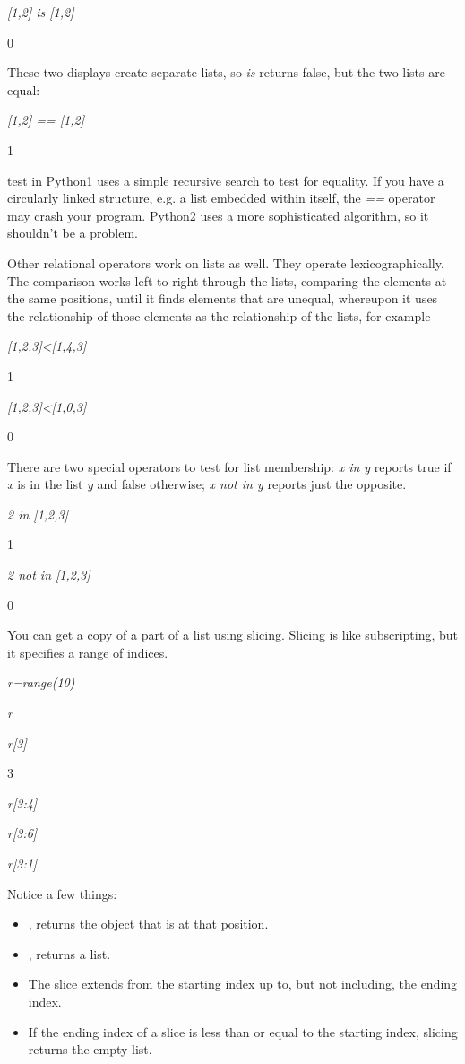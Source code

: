 \emph{{[}1,2{]} is {[}1,2{]}}

0

These two displays create separate
lists, so \emph{is} returns false, but the two lists are equal:


\emph{{[}1,2{]} == {[}1,2{]}}

1

 test in
Python1 uses a simple recursive search to test for equality. If you have
a circularly linked structure, e.g. a list embedded within itself, the
\emph{==} operator may crash your program. Python2 uses a more
sophisticated algorithm, so it shouldn't be a problem.

Other relational operators work on
lists as well. They operate lexicographically. The comparison works left
to right through the lists, comparing the elements at the same
positions, until it finds elements that are unequal, whereupon it uses
the relationship of those elements as the relationship of the lists, for
example


\emph{{[}1,2,3{]}\textless{}{[}1,4,3{]}}

1


\emph{{[}1,2,3{]}\textless{}{[}1,0,3{]}}

0

There are two special operators to
test for list membership: \emph{x in y} reports true if \emph{x} is in
the list \emph{y} and false otherwise; \emph{x not in y} reports just
the opposite.


\emph{2 in {[}1,2,3{]}}

1


\emph{2 not in {[}1,2,3{]}}

0

You can get a copy of a part of a
list using slicing. Slicing is like subscripting, but it specifies a
range of indices.


\emph{r=range(10)}


\emph{r}




\emph{r{[}3{]}}

3


\emph{r{[}3:4{]}}




\emph{r{[}3:6{]}}




\emph{r{[}3:1{]}}



Notice a few things:

\begin{itemize}
\tightlist
\item
   ,
  returns the object that is at that position.
\item
  ,
  returns a list.
\item
  The slice extends from the
  starting index up to, but not including, the ending index.
\item
  If the ending index of a slice is
  less than or equal to the starting index, slicing returns the empty
  list.
\end{itemize}

